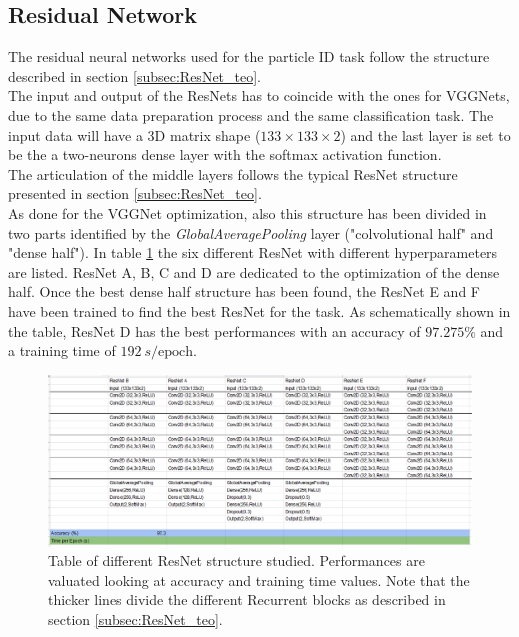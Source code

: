 \subsection{Residual Network}
The residual neural networks used for the particle ID task follow the structure described in section \ref{subsec:ResNet_teo}.\\
The input and output of the ResNets has to coincide with the ones for VGGNets, due to the same data preparation process and the same classification task. The input data will have a 3D matrix shape ($133\times 133\times 2$) and the last layer is set to be the a two-neurons dense layer with the softmax activation function.\\
The articulation of the middle layers follows the typical ResNet structure presented in section \ref{subsec:ResNet_teo}.\\
As done for the VGGNet optimization, also this structure has been divided in two parts identified by the \textit{GlobalAveragePooling} layer ("colvolutional half" and "dense half"). In table \ref{fig:ResNet-tested} the six different ResNet with different hyperparameters are listed. ResNet A, B, C and D are dedicated to the optimization of the dense half. Once the best dense half structure has been found, the ResNet E and F have been trained to find the best ResNet for the task. As schematically shown in the table, ResNet D has the best performances with an accuracy of $97.275\%$ and a training time of $192\ s/\text{epoch}$.\\

\begin{figure}
	\centering
	\includegraphics[width=1.\textwidth]{IMG/Cap6/ResNet-Tab.png}
	\caption{Table of different ResNet structure studied. Performances are valuated looking at accuracy and training time values. Note that the thicker lines divide the different Recurrent blocks as described in section \ref{subsec:ResNet_teo}.}
	\label{fig:ResNet-tested}
\end{figure}

